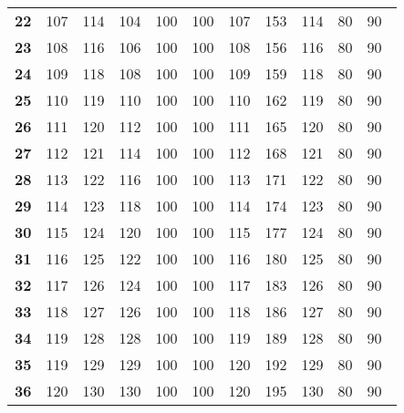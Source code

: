 \begin {table}[H]
\begin{tabularx}{\columnwidth}{>{\bfseries}YYYYYYYYYYY}
		22 & 107 & 114 & 104 & 100 & 100 & 107 & 153 & 114 & 80 & 90\\
		23 & 108 & 116 & 106 & 100 & 100 & 108 & 156 & 116 & 80 & 90\\
		24 & 109 & 118 & 108 & 100 & 100 & 109 & 159 & 118 & 80 & 90\\
		25 & 110 & 119 & 110 & 100 & 100 & 110 & 162 & 119 & 80 & 90\\
		26 & 111 & 120 & 112 & 100 & 100 & 111 & 165 & 120 & 80 & 90\\
		27 & 112 & 121 & 114 & 100 & 100 & 112 & 168 & 121 & 80 & 90\\
		28 & 113 & 122 & 116 & 100 & 100 & 113 & 171 & 122 & 80 & 90\\
		29 & 114 & 123 & 118 & 100 & 100 & 114 & 174 & 123 & 80 & 90\\
		30 & 115 & 124 & 120 & 100 & 100 & 115 & 177 & 124 & 80 & 90\\
		31 & 116 & 125 & 122 & 100 & 100 & 116 & 180 & 125 & 80 & 90\\
		32 & 117 & 126 & 124 & 100 & 100 & 117 & 183 & 126 & 80 & 90\\
		33 & 118 & 127 & 126 & 100 & 100 & 118 & 186 & 127 & 80 & 90\\
		34 & 119 & 128 & 128 & 100 & 100 & 119 & 189 & 128 & 80 & 90\\
		35 & 119 & 129 & 129 & 100 & 100 & 120 & 192 & 129 & 80 & 90\\
		36 & 120 & 130 & 130 & 100 & 100 & 120 & 195 & 130 & 80 & 90\
  \end {tabularx}
\end {table}
\newpage

